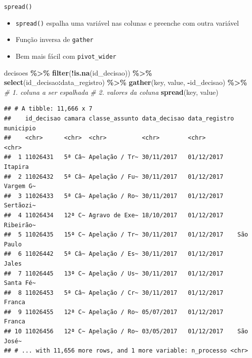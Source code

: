 \documentclass[
  9pt,
  ignorenonframetext,
]{beamer}
\newenvironment{Shaded}{\begin{snugshade}}{\end{snugshade}}
\newcommand{\CommentTok}[1]{\textcolor[rgb]{0.56,0.35,0.01}{\textit{#1}}}
\newcommand{\KeywordTok}[1]{\textcolor[rgb]{0.13,0.29,0.53}{\textbf{#1}}}
\newcommand{\NormalTok}[1]{#1}
\newcommand{\OperatorTok}[1]{\textcolor[rgb]{0.81,0.36,0.00}{\textbf{#1}}}
\newcommand{\StringTok}[1]{\textcolor[rgb]{0.31,0.60,0.02}{#1}}
\begin{document}
\begin{frame}[fragile]{\texttt{spread()}}
\protect\hypertarget{spread}{}
\begin{itemize}
\item
  \texttt{spread()} espalha uma variável nas colunas e preenche com
  outra variável
\item
  Função inversa de \texttt{gather}
\item
  Bem mais fácil com \texttt{pivot\_wider}
\end{itemize}

\begin{Shaded}
\begin{Highlighting}[]
\NormalTok{decisoes }\OperatorTok{\%\textgreater{}\%}\StringTok{ }
\StringTok{  }\KeywordTok{filter}\NormalTok{(}\OperatorTok{!}\KeywordTok{is.na}\NormalTok{(id\_decisao)) }\OperatorTok{\%\textgreater{}\%}\StringTok{ }
\StringTok{  }\KeywordTok{select}\NormalTok{(id\_decisao}\OperatorTok{:}\NormalTok{data\_registro) }\OperatorTok{\%\textgreater{}\%}\StringTok{ }
\StringTok{  }\KeywordTok{gather}\NormalTok{(key, value, }\OperatorTok{{-}}\NormalTok{id\_decisao) }\OperatorTok{\%\textgreater{}\%}\StringTok{ }
\StringTok{  }\CommentTok{\# 1. coluna a ser espalhada}
\StringTok{  }\CommentTok{\# 2. valores da coluna}
\StringTok{  }\KeywordTok{spread}\NormalTok{(key, value)}
\end{Highlighting}
\end{Shaded}

\begin{verbatim}
## # A tibble: 11,666 x 7
##    id_decisao camara classe_assunto data_decisao data_registro municipio
##    <chr>      <chr>  <chr>          <chr>        <chr>         <chr>    
##  1 11026431   5ª Câ~ Apelação / Tr~ 30/11/2017   01/12/2017    Itapira  
##  2 11026432   5ª Câ~ Apelação / Fu~ 30/11/2017   01/12/2017    Vargem G~
##  3 11026433   5ª Câ~ Apelação / Ro~ 30/11/2017   01/12/2017    Sertãozi~
##  4 11026434   12ª C~ Agravo de Exe~ 18/10/2017   01/12/2017    Ribeirão~
##  5 11026435   15ª C~ Apelação / Tr~ 30/11/2017   01/12/2017    São Paulo
##  6 11026442   5ª Câ~ Apelação / Es~ 30/11/2017   01/12/2017    Jales    
##  7 11026445   13ª C~ Apelação / Us~ 30/11/2017   01/12/2017    Santa Fé~
##  8 11026453   5ª Câ~ Apelação / Cr~ 30/11/2017   01/12/2017    Franca   
##  9 11026455   12ª C~ Apelação / Ro~ 05/07/2017   01/12/2017    Franca   
## 10 11026456   12ª C~ Apelação / Ro~ 03/05/2017   01/12/2017    São José~
## # ... with 11,656 more rows, and 1 more variable: n_processo <chr>
\end{verbatim}
\end{frame}
\end{document}
